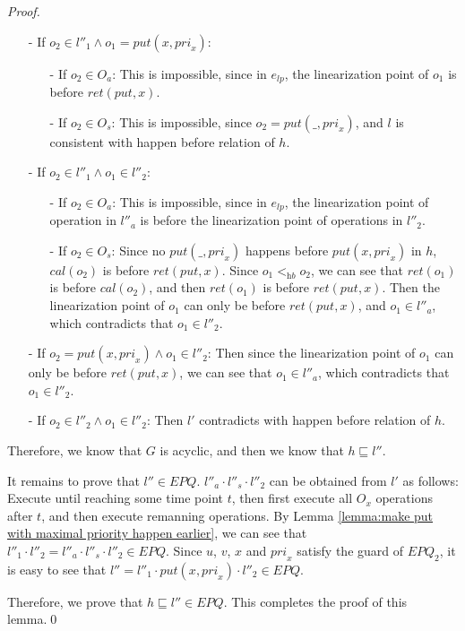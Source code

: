 \begin {proof}
\begin{itemize}
\item[-] If $o_2 \in l''_1 \wedge o_1 = \textit{put}(x,\textit{pri}_x)$:
    \begin{itemize}
    \setlength{\itemsep}{0.5pt}
    \item[-] If $o_2 \in O_a$: This is impossible, since in $e_{\textit{lp}}$, the linearization point of $o_1$ is before $\textit{ret}(\textit{put},x)$.

    \item[-] If $o_2 \in O_s$: This is impossible, since $o_2 = \textit{put}(\_,\textit{pri}_x)$, and $l$ is consistent with happen before relation of $h$.
    \end{itemize}

\item[-] If $o_2 \in l''_1 \wedge o_1 \in l''_2$:
    \begin{itemize}
    \setlength{\itemsep}{0.5pt}
    \item[-] If $o_2 \in O_a$: This is impossible, since in $e_{\textit{lp}}$, the linearization point of operation in $l''_a$ is before the linearization point of operations in $l''_2$.

    \item[-] If $o_2 \in O_s$: Since no $\textit{put}(\_,\textit{pri}_x)$ happens before $\textit{put}(x,\textit{pri}_x)$ in $h$, $\textit{cal}(o_2)$ is before $\textit{ret}(\textit{put},x)$. Since $o_1 <_{\textit{hb}} o_2$, we can see that $\textit{ret}(o_1)$ is before $\textit{cal}(o_2)$, and then $\textit{ret}(o_1)$ is before $\textit{ret}(\textit{put},x)$. Then the linearization point of $o_1$ can only be before $\textit{ret}(\textit{put},x)$, and $o_1 \in l''_a$, which contradicts that $o_1 \in l''_2$.
    \end{itemize}

\item[-] If $o_2 = \textit{put}(x,\textit{pri}_x) \wedge o_1 \in l''_2$: Then since the linearization point of $o_1$ can only be before $\textit{ret}(\textit{put},x)$, we can see that $o_1 \in l''_a$, which contradicts that $o_1 \in l''_2$.

\item[-] If $o_2 \in l''_2 \wedge o_1 \in l''_2$: Then $l'$ contradicts with happen before relation of $h$.
\end{itemize}

Therefore, we know that $G$ is acyclic, and then we know that $h \sqsubseteq l''$.

It remains to prove that $l'' \in \textit{EPQ}$. $l''_a \cdot l''_s \cdot l''_2$ can be obtained from $l'$ as follows: Execute until reaching some time point $t$, then first execute all $O_x$ operations after $t$, and then execute remanning operations. By Lemma \ref{lemma:make put with maximal priority happen earlier}, we can see that $l''_1 \cdot l''_2 = l''_a \cdot l''_s \cdot l''_2 \in \textit{EPQ}$. Since $u$, $v$, $x$ and $\textit{pri}_x$ satisfy the guard of $\textit{EPQ}_2$, it is easy to see that $l'' = l''_1 \cdot \textit{put}(x,\textit{pri}_x) \cdot l''_2 \in \textit{EPQ}$.

Therefore, we prove that $h \sqsubseteq l'' \in \textit{EPQ}$. This completes the proof of this lemma.\qed
\end {proof}


